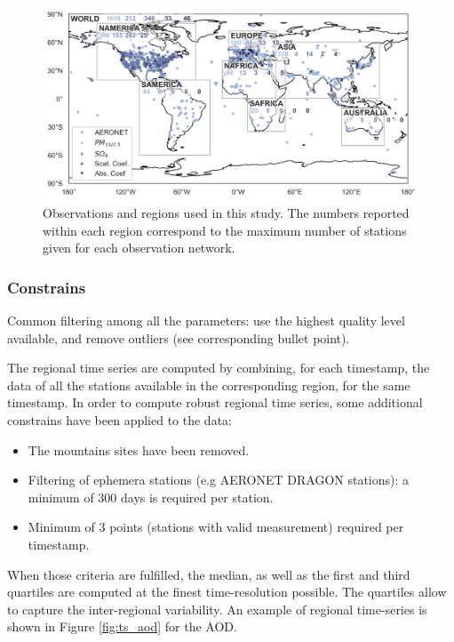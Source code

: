 \documentclass[journal abbreviation, manuscript]{copernicus}
\begin{document}
\begin{figure}
 \includegraphics[width=12cm]{../scripts/figs/maps/av_obs.png}
 \caption{Observations and regions used in this study. The numbers reported within each region correspond to the maximum number of stations given for each observation network.}
 \label{fig:map_obs}
\end{figure}

\subsubsection{Constrains}
Common filtering among all the parameters: use the highest quality level available, and remove outliers (see corresponding bullet point).

The regional time series are computed by combining, for each timestamp, the data of all the stations available in the corresponding region, for the same timestamp.
In order to compute robust regional time series, some additional constrains have been applied to the data:
\begin{itemize}
 \item The mountains sites have been removed.
 \item Filtering of ephemera stations (e.g AERONET DRAGON stations): a minimum of 300 days is required per station.
 \item Minimum of 3 points (stations with valid measurement) required per timestamp.
\end{itemize}

When those criteria are fulfilled, the median, as well as the first and third quartiles are computed at the finest time-resolution possible. The quartiles allow to capture the inter-regional variability. An example of regional time-series is shown in Figure \ref{fig:ts_aod} for the AOD.
\end{document}
